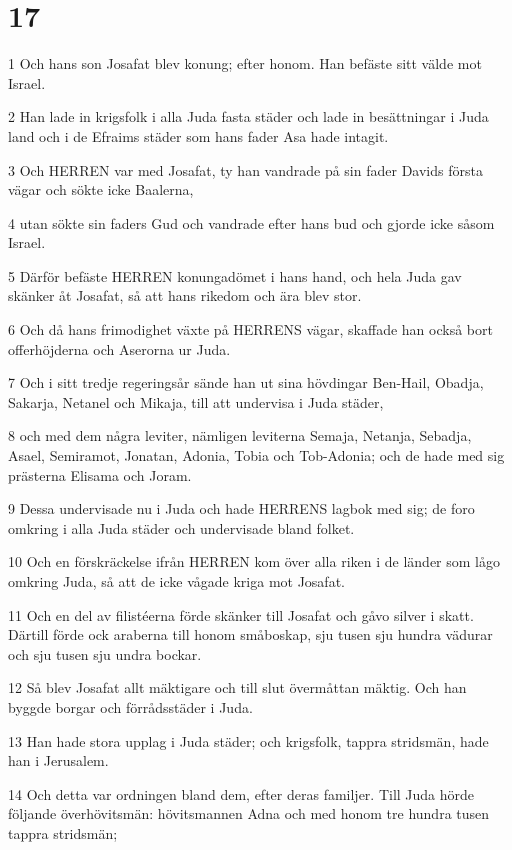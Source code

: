 \chapter{17}

\par 1 Och hans son Josafat blev konung; efter honom. Han befäste sitt välde mot Israel.
\par 2 Han lade in krigsfolk i alla Juda fasta städer och lade in besättningar i Juda land och i de Efraims städer som hans fader Asa hade intagit.
\par 3 Och HERREN var med Josafat, ty han vandrade på sin fader Davids första vägar och sökte icke Baalerna,
\par 4 utan sökte sin faders Gud och vandrade efter hans bud och gjorde icke såsom Israel.
\par 5 Därför befäste HERREN konungadömet i hans hand, och hela Juda gav skänker åt Josafat, så att hans rikedom och ära blev stor.
\par 6 Och då hans frimodighet växte på HERRENS vägar, skaffade han också bort offerhöjderna och Aserorna ur Juda.
\par 7 Och i sitt tredje regeringsår sände han ut sina hövdingar Ben-Hail, Obadja, Sakarja, Netanel och Mikaja, till att undervisa i Juda städer,
\par 8 och med dem några leviter, nämligen leviterna Semaja, Netanja, Sebadja, Asael, Semiramot, Jonatan, Adonia, Tobia och Tob-Adonia; och de hade med sig prästerna Elisama och Joram.
\par 9 Dessa undervisade nu i Juda och hade HERRENS lagbok med sig; de foro omkring i alla Juda städer och undervisade bland folket.
\par 10 Och en förskräckelse ifrån HERREN kom över alla riken i de länder som lågo omkring Juda, så att de icke vågade kriga mot Josafat.
\par 11 Och en del av filistéerna förde skänker till Josafat och gåvo silver i skatt. Därtill förde ock araberna till honom småboskap, sju tusen sju hundra vädurar och sju tusen sju undra bockar.
\par 12 Så blev Josafat allt mäktigare och till slut övermåttan mäktig. Och han byggde borgar och förrådsstäder i Juda.
\par 13 Han hade stora upplag i Juda städer; och krigsfolk, tappra stridsmän, hade han i Jerusalem.
\par 14 Och detta var ordningen bland dem, efter deras familjer. Till Juda hörde följande överhövitsmän: hövitsmannen Adna och med honom tre hundra tusen tappra stridsmän;
